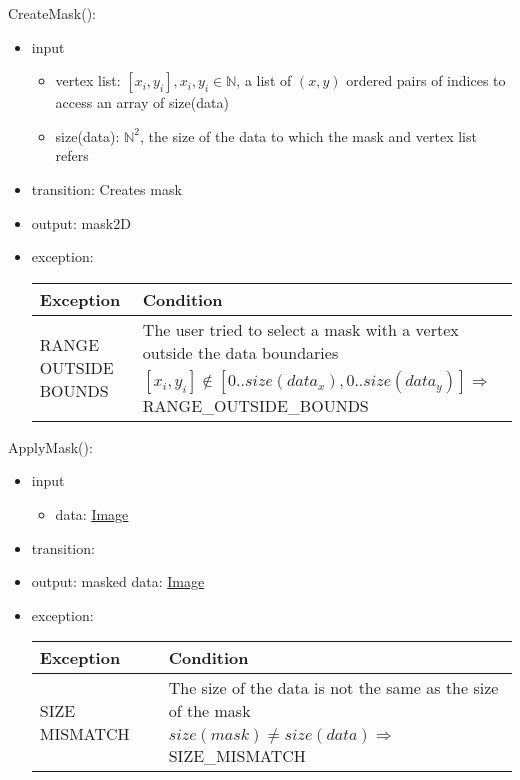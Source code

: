 \documentclass[12pt, titlepage]{article}
\begin{document}
\noindent CreateMask():
\begin{itemize}
    \item input
    \begin{itemize}
        \item vertex list: $[x_i, y_i], x_i, y_i \in \mathbb{N}$, a list of $(x,y)$ ordered pairs of indices to access an array of size(data)
        \item size(data): $\mathbb{N}^2$, the size of the data to which the mask and vertex list refers
    \end{itemize}
    \item transition: Creates mask
    \item output: mask2D
    \item exception:
    \begin{center}
        \begin{tabular}{p{3.5cm} p{12cm}}
            \toprule[0.15em]
            \textbf{Exception} & \textbf{Condition}\\
            \midrule[0.1em]
            \multirow{2}{0.25\textwidth}{RANGE OUTSIDE BOUNDS} & The user tried to select a mask with a vertex outside the data boundaries\\ 
            & $[x_i, y_i] \notin [0..size(data_x), 0..size(data_y)] \Rightarrow$ RANGE\_OUTSIDE\_BOUNDS\\ 
            \bottomrule[0.15em]
        \end{tabular}
    \end{center}
\end{itemize}

\noindent ApplyMask():
\begin{itemize}
    \item input
    \begin{itemize}
        \item data: \hyperref[Mod:Image]{Image}
    \end{itemize}
    \item transition:
    \item output: masked data: \hyperref[Mod:Image]{Image}
    \item exception:
    \begin{center}
        \begin{tabular}{p{3.5cm} p{12cm}}
            \toprule[0.15em]
            \textbf{Exception} & \textbf{Condition}\\
            \midrule[0.1em]
            \multirow{2}{0.25\textwidth}{SIZE MISMATCH} & The size of the data is not the same as the size of the mask\\ 
            & $size(mask) \neq size(data) \Rightarrow$ SIZE\_MISMATCH\\ 
            \bottomrule[0.15em]
        \end{tabular}
    \end{center}
\end{itemize}
\end{document}
